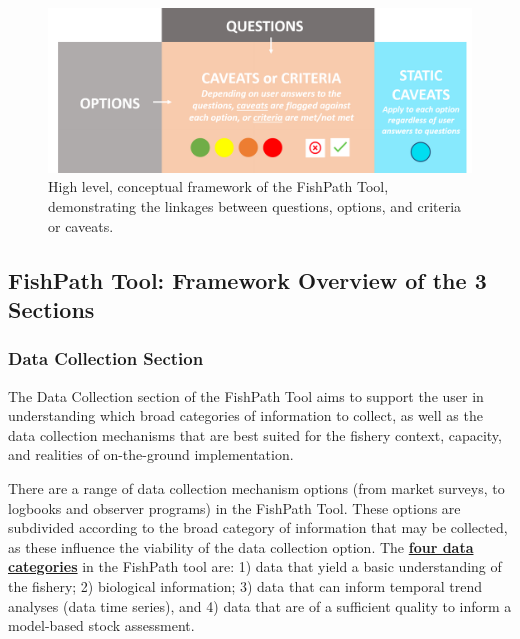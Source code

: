 \documentclass[
  11pt,
]{book}
\begin{document}
\begin{figure}
 
 {\centering \includegraphics[width=0.95\linewidth]{images/conceptual-framework} 
 
 }
 
 \caption{High level, conceptual framework of the FishPath Tool, demonstrating the linkages between questions, options, and criteria or caveats.}\label{fig:conceptual}
 \end{figure}

\hypertarget{fishpath-tool-framework-overview-of-the-3-sections}{%
\subsection{FishPath Tool: Framework Overview of the 3 Sections}\label{fishpath-tool-framework-overview-of-the-3-sections}}

\hypertarget{data-collection-section}{%
\subsubsection{Data Collection Section}\label{data-collection-section}}

The Data Collection section of the FishPath Tool aims to support the user in understanding which broad categories of information to collect, as well as the data collection mechanisms that are best suited for the fishery context, capacity, and realities of on-the-ground implementation.

There are a range of data collection mechanism options (from market surveys, to logbooks and observer programs) in the FishPath Tool. These options are subdivided according to the broad category of information that may be collected, as these influence the viability of the data collection option. The \protect\hyperlink{data-categories}{\textbf{four data categories}} in the FishPath tool are: 1) data that yield a basic understanding of the fishery; 2) biological information; 3) data that can inform temporal trend analyses (data time series), and 4) data that are of a sufficient quality to inform a model-based stock assessment.
\end{document}
